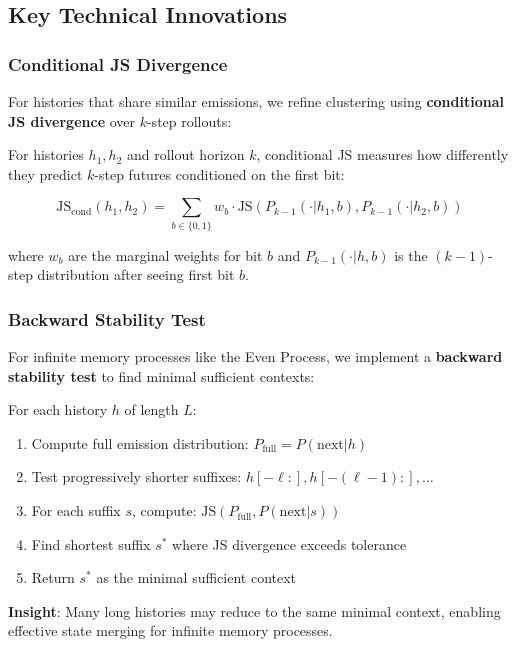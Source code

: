 \documentclass[11pt]{article}
\begin{document}
\subsection{Key Technical Innovations}

\subsubsection{Conditional JS Divergence}

For histories that share similar emissions, we refine clustering using \textbf{conditional JS divergence} over $k$-step rollouts:

\begin{notebox}
For histories $h_1, h_2$ and rollout horizon $k$, conditional JS measures how differently they predict $k$-step futures conditioned on the first bit:

$$\text{JS}_{\text{cond}}(h_1, h_2) = \sum_{b \in \{0,1\}} w_b \cdot \text{JS}(P_{k-1}(\cdot|h_1,b), P_{k-1}(\cdot|h_2,b))$$

where $w_b$ are the marginal weights for bit $b$ and $P_{k-1}(\cdot|h,b)$ is the $(k-1)$-step distribution after seeing first bit $b$.
\end{notebox}

\subsubsection{Backward Stability Test}

For infinite memory processes like the Even Process, we implement a \textbf{backward stability test} to find minimal sufficient contexts:

\begin{resultbox}
For each history $h$ of length $L$:
\begin{enumerate}
\item Compute full emission distribution: $P_{\text{full}} = P(\text{next}|h)$
\item Test progressively shorter suffixes: $h[-\ell:], h[-(\ell-1):], \ldots$
\item For each suffix $s$, compute: $\text{JS}(P_{\text{full}}, P(\text{next}|s))$
\item Find shortest suffix $s^*$ where JS divergence exceeds tolerance
\item Return $s^*$ as the minimal sufficient context
\end{enumerate}

\textbf{Insight}: Many long histories may reduce to the same minimal context, enabling effective state merging for infinite memory processes.
\end{resultbox}
\end{document}
